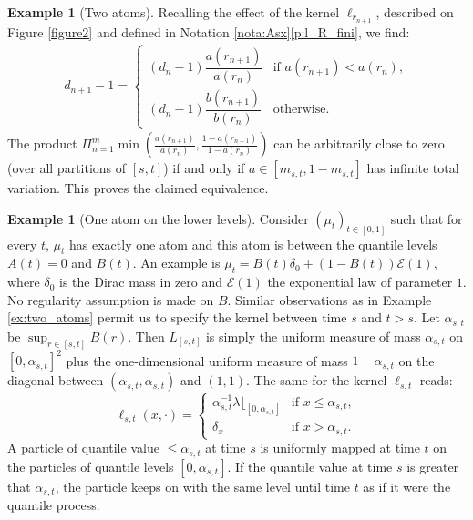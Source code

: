 \documentclass[JEP,XML,SOM,Unicode,NoEqCountersInSection,NoFloatCountersInSection,published]{cedram}
\theoremstyle{plain}
\theoremstyle{definition}
\newtheorem{ex}[them]{Example}
\newcommand{\la}{\lambda}
\begin{document}
\begin{ex}[Two atoms]
Recalling the effect of the kernel $\ell_{r_{n+1}}$, described on Figure \ref{figure2} and defined in Notation \ref{nota:Asx}\eqref{p:l_R_fini}, we find:\vspace*{-5pt}
\begin{align*}
d_{n+1}-1=
\begin{cases}
(d_{n}-1)\dfrac{a(r_{n+1})}{a(r_n)}&\text{if }a(r_{n+1})<a(r_n),\\[8pt]
(d_n-1)\dfrac{b(r_{n+1})}{b(r_n)}&\text{otherwise.}
\end{cases}
\end{align*}
The product $\Pi_{n=1}^m\min(\frac{a(r_{n+1})}{a(r_n)},\frac{1-a(r_{n+1})}{1-a(r_n)})$ can be arbitrarily close to zero (over all partitions of $[s,t]$) if and only if $a\in[m_{s,t},1-m_{s,t}]$ has infinite total variation. This proves the claimed equivalence.
\end{ex}

\begin{ex}[One atom on the lower levels]\label{ex:exponential}
Consider $(\mu_t)_{t\in{[0,1]}}$ such that for every $t$, $\mu_t$ has exactly one atom and this atom is between the quantile levels $A(t)=0$ and $B(t)$. An example is $\mu_t=B(t)\delta_0+(1-B(t))\mathcal{E}(1)$, where $\delta_0$ is the Dirac mass in zero and $\mathcal{E}(1)$ the exponential law of parameter $1$. No regularity assumption is made on $B$. Similar observations as in Example \ref{ex:two_atoms} permit us to specify the kernel between time $s$ and $t>s$. Let $\alpha_{s,t}$ be $\sup_{r\in[s,t]}B(r)$. Then $L_{[s,t]}$ is simply the uniform measure of mass $\alpha_{s,t}$ on $[0,\alpha_{s,t}]^2$ plus the one-dimensional uniform measure of mass $1-\alpha_{s,t}$ on the diagonal between $(\alpha_{s,t},\alpha_{s,t})$ and $(1,1)$. The same for the kernel $\ell_{s,t}$ reads:
\[
\ell_{s,t}(x,\cdot)=
\begin{cases}
\alpha_{s,t}^{-1}\la\lfloor_{[0,\alpha_{s,t}]}&\text{if }x\leq \alpha_{s,t},\\
\delta_x&\text{if }x>\alpha_{s,t}.
\end{cases}
\]
A particle of quantile value $\leq \alpha_{s,t}$ at time $s$ is uniformly mapped at time $t$ on the particles of quantile levels $[0,\alpha_{s,t}]$. If the quantile value at time $s$ is greater that $\alpha_{s,t}$, the particle keeps on with the same level until time $t$ as if it were the quantile process.
\end{ex}

\end{document}
